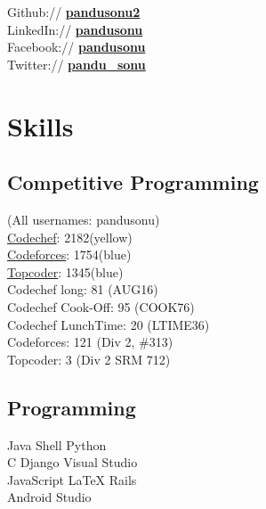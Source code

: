 \documentclass[letterpaper]{deedy-resume} %
\begin{document}
\begin{minipage}[t]{0.33\textwidth}
Github:// \href{https://github.com/pandusonu2}{\bf pandusonu2} \\
LinkedIn:// \href{https://www.linkedin.com/in/pandusonu}{\bf pandusonu} \\
Facebook:// \href{https://www.facebook.com/pandu.sonu}{\bf pandusonu} \\
Twitter:// \href{https://twitter.com/pandu_sonu} {\bf pandu\_sonu}

\sectionspace %

\section{Skills}

\sectionspace

\subsection{Competitive Programming}
(All usernames: pandusonu) \\
\href{https://www.codechef.com/users/pandusonu}{Codechef}: 2182(yellow)\\
\href{http://codeforces.com/profile/pandusonu}{Codeforces}: 1754(blue) \\
\href{https://www.topcoder.com/members/pandusonu/}{Topcoder}: 1345(blue)\\
Codechef long: 81 (AUG16)\\
Codechef Cook-Off: 95 (COOK76)\\
Codechef LunchTime: 20 (LTIME36)\\
Codeforces: 121 (Div 2, \#313)\\
Topcoder: 3 (Div 2 SRM 712)

\sectionspace

\subsection{Programming}

Java \textbullet{} Shell \textbullet{} Python \textbullet{} \\
C \textbullet{} Django \textbullet{} Visual Studio \\

JavaScript \textbullet{} \LaTeX \textbullet{} Rails \textbullet{} \\
Android Studio 




\end{minipage} %
\end{document}
